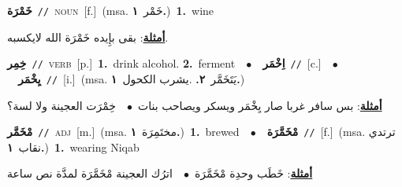 \documentclass[10pt,a4paper,twoside]{article} %
\begin{document}
\begin{multicols}{2}
{\setlength\topsep{0pt}\textbf{\foreignlanguage{arabic}{خَمْرَة}}\ {\color{gray}\texttt{//}\color{black}}\ \textsc{noun}\ [f.]\ \color{gray}(msa. \foreignlanguage{arabic}{خَمْر}~\foreignlanguage{arabic}{\textbf{١.}})\color{black}\ \textbf{1.}~wine\  \begin{flushright}\color{gray}\foreignlanguage{arabic}{\textbf{\underline{\foreignlanguage{arabic}{أمثلة}}}: بقى بإِيده خَمْرَة الله لايكسبه.}\end{flushright}\color{black}} \vspace{2mm}

{\setlength\topsep{0pt}\textbf{\foreignlanguage{arabic}{خِمِر}}\ {\color{gray}\texttt{//}\color{black}}\ \textsc{verb}\ [p.]\ \textbf{1.}~drink alcohol.  \textbf{2.}~ferment\ \ $\bullet$\ \ \setlength\topsep{0pt}\textbf{\foreignlanguage{arabic}{اِخْمَر}}\ {\color{gray}\texttt{//}\color{black}}\ [c.]\ \ $\bullet$\ \ \setlength\topsep{0pt}\textbf{\foreignlanguage{arabic}{يِخْمَر}}\ {\color{gray}\texttt{//}\color{black}}\ [i.]\ \color{gray}(msa. \foreignlanguage{arabic}{يَتَخَمَّر}~\foreignlanguage{arabic}{\textbf{٢.}}  .\foreignlanguage{arabic}{يشرب الكحول}~\foreignlanguage{arabic}{\textbf{١.}})\color{black}\  \begin{flushright}\color{gray}\foreignlanguage{arabic}{\textbf{\underline{\foreignlanguage{arabic}{أمثلة}}}: بس سافر غربا صار يِخْمَر ويسكر ويصاحب بنات\ $\bullet$\ \  خِمْرَت العجينة ولا لسة؟}\end{flushright}\color{black}} \vspace{2mm}

{\setlength\topsep{0pt}\textbf{\foreignlanguage{arabic}{مْخَمَّر}}\ {\color{gray}\texttt{//}\color{black}}\ \textsc{adj}\ [m.]\ \color{gray}(msa. \foreignlanguage{arabic}{مختَمِرَة}~\foreignlanguage{arabic}{\textbf{١.}})\color{black}\ \textbf{1.}~brewed\ \ $\bullet$\ \ \setlength\topsep{0pt}\textbf{\foreignlanguage{arabic}{مْخَمَّرَة}}\ {\color{gray}\texttt{//}\color{black}}\ [f.]\ \color{gray}(msa. \foreignlanguage{arabic}{ترتدي نقاب}~\foreignlanguage{arabic}{\textbf{١.}})\color{black}\ \textbf{1.}~wearing Niqab\  \begin{flushright}\color{gray}\foreignlanguage{arabic}{\textbf{\underline{\foreignlanguage{arabic}{أمثلة}}}: خَطَب وحدِة مْخَمَّرَة\ $\bullet$\ \  اترُك العجينة مْخَمَّرَة لمدَّة نص ساعة}\end{flushright}\color{black}} \vspace{2mm}


\end{multicols}
\end{document}
